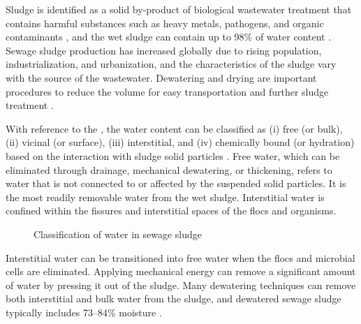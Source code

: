 \begin{sloppypar}
Sludge is identified as a solid by-product of biological wastewater treatment that contains harmful substances such as heavy metals, pathogens, and organic contaminants \cite{Wu2020}, and the wet sludge can contain up to 98\% of water content
\cite{Chan2016, SyedHassan2017}. Sewage sludge production has increased globally due to rising population, industrialization, and urbanization, and the characteristics of the sludge vary with the source of the wastewater. Dewatering and drying are important procedures to reduce the volume for easy transportation and further sludge treatment \cite{Chang2023}. 
\end{sloppypar}

With reference to the , the water content can be classified as (i) free (or bulk), (ii) vicinal (or surface), (iii) interstitial, and (iv) chemically bound (or hydration) based on the interaction with sludge solid particles \cite{SyedHassan2017, Qi2020, Vaxelaire2004, Novak2006}. Free water, which can be eliminated through drainage, mechanical dewatering, or thickening, refers to water that is not connected to or affected by the suspended solid particles. It is the most readily removable water from the wet sludge. Interstitial water is confined within the fissures and interstitial spaces of the flocs and organisms.


\begin{figure}[H]
\centering
{}
\caption{Classification of water in sewage sludge}\cite{Qi2020}
\label{fig:Sludge_water}
\end{figure}

Interstitial water can be transitioned into free water when the flocs and microbial cells are eliminated. Applying mechanical energy can remove a significant amount of water by pressing it out of the sludge. Many dewatering techniques can remove both interstitial and bulk water from the sludge, and dewatered sewage sludge typically includes 73–84\% moisture \cite{Chan2016}.
 
